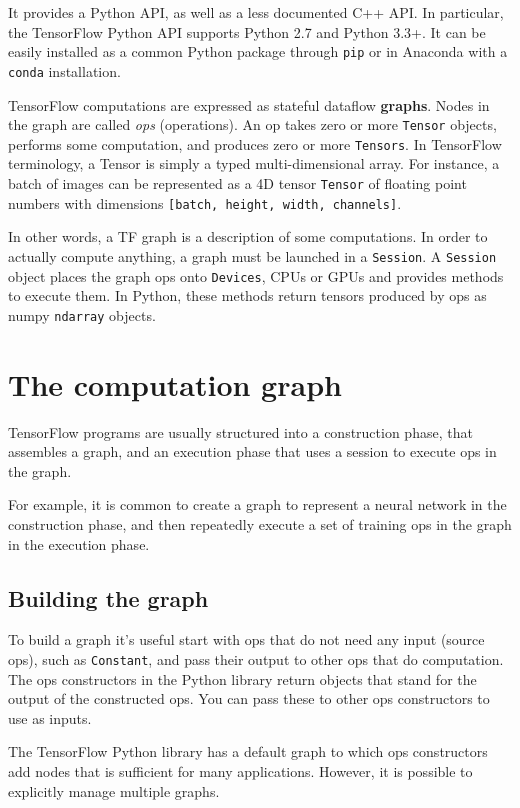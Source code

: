 It provides a Python API, as well as a less documented C++ API. In particular, the TensorFlow Python API supports Python 2.7 and Python 3.3+. It can be easily installed as a common Python package through \lstinline|pip| or in Anaconda with a \lstinline|conda| installation.

TensorFlow computations are expressed as stateful dataflow \textbf{graphs}. Nodes in the graph are called \emph{ops} (\ie operations). An op takes zero or more \lstinline|Tensor| objects, performs some computation, and produces zero or more \lstinline|Tensors|. In TensorFlow terminology, a Tensor is simply a typed multi-dimensional array. For instance, a batch of images can be represented as a 4D tensor \lstinline|Tensor| of floating point numbers with dimensions \lstinline|[batch, height, width, channels]|.

In other words, a \ac{TF} graph is a description of some computations. In order to actually compute anything, a graph must be launched in a \lstinline|Session|. A \lstinline|Session| object places the graph ops onto \lstinline|Devices|, \ie \acsp{CPU} or \acsp{GPU} and provides methods to execute them. In Python, these methods return tensors produced by ops as numpy \lstinline|ndarray| objects.

\section{The computation graph}

TensorFlow programs are usually structured into a construction phase, that assembles a graph, and an execution phase that uses a session to execute ops in the graph.

For example, it is common to create a graph to represent a neural network in the construction phase, and then repeatedly execute a set of training ops in the graph in the execution phase.

\subsection{Building the graph}

To build a graph it's useful start with ops that do not need any input (source ops), such as \lstinline|Constant|, and pass their output to other ops that do computation. The ops constructors in the Python library return objects that stand for the output of the constructed ops. You can pass these to other ops constructors to use as inputs.

The TensorFlow Python library has a default graph to which ops constructors add nodes that is sufficient for many applications. However, it is possible to explicitly manage multiple graphs.


